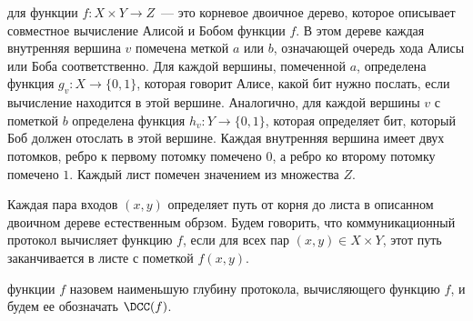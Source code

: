  для функции $f\colon X \times Y \to Z$~--- это корневое двоичное
дерево, которое описывает совместное вычисление Алисой и Бобом функции $f$. В этом дереве каждая
внутренняя вершина $v$ помечена меткой $a$ или $b$, означающей очередь хода Алисы или Боба
соответственно. Для каждой вершины, помеченной $a$, определена функция $g_v\colon X \to \{0, 1\}$,
которая говорит Алисе, какой бит нужно послать, если вычисление находится в этой вершине. Аналогично, для
каждой вершины $v$ с пометкой $b$ определена функция $h_v\colon Y \to \{0, 1\}$, которая определяет бит,
который Боб должен отослать в этой вершине. Каждая внутренняя вершина имеет двух потомков, ребро к
первому потомку помечено $0$, а ребро ко второму потомку помечено $1$. Каждый лист помечен значением из
множества $Z$.

Каждая пара входов $(x, y)$ определяет путь от корня до листа в описанном двоичном дереве естественным
обрзом. Будем говорить, что коммуникационный протокол вычисляет функцию $f$, если для всех пар $(x, y)
\in X \times Y$, этот путь заканчивается в листе с пометкой $f(x, y)$.

 функции $f$ назовем наименьшую глубину протокола, вычисляющего
функцию $f$, и будем ее обозначать $\DCC(f)$.